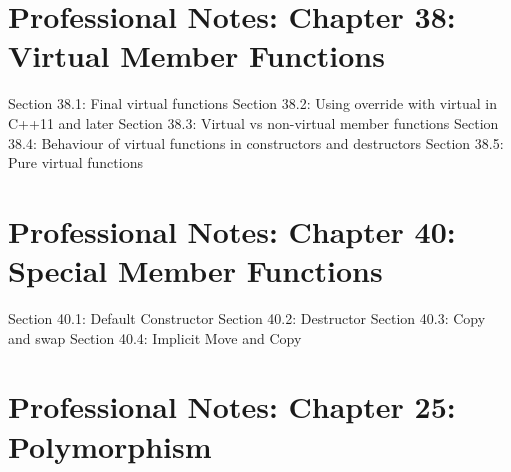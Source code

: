 \hypertarget{professional-notes-chapter-38-virtual-member-functions}{%
\chapter{Professional Notes: Chapter 38: Virtual Member
Functions}\label{professional-notes-chapter-38-virtual-member-functions}}

Section 38.1: Final virtual functions Section 38.2: Using override with
virtual in C++11 and later Section 38.3: Virtual vs non-virtual member
functions Section 38.4: Behaviour of virtual functions in constructors
and destructors Section 38.5: Pure virtual functions

\hypertarget{professional-notes-chapter-40-special-member-functions}{%
\chapter{Professional Notes: Chapter 40: Special Member
Functions}\label{professional-notes-chapter-40-special-member-functions}}

Section 40.1: Default Constructor Section 40.2: Destructor Section 40.3:
Copy and swap Section 40.4: Implicit Move and Copy

\hypertarget{professional-notes-chapter-25-polymorphism-1}{%
\chapter{Professional Notes: Chapter 25:
Polymorphism}\label{professional-notes-chapter-25-polymorphism-1}}

